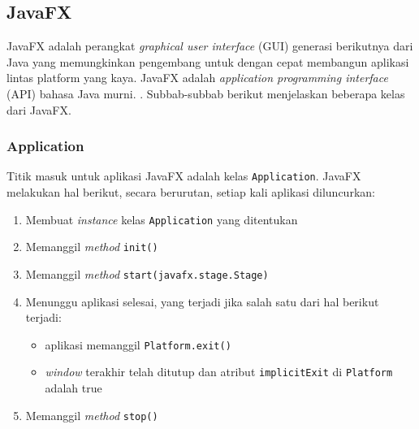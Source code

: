 \subsection{JavaFX}
\label{sec:javafx}
JavaFX adalah perangkat \textit{graphical user interface} (GUI) generasi berikutnya dari Java yang memungkinkan pengembang untuk dengan cepat membangun aplikasi lintas platform yang kaya. JavaFX adalah \textit{application programming interface} (API) bahasa Java murni. \cite{javafxintro}. Subbab-subbab berikut menjelaskan beberapa kelas dari JavaFX. \cite{javafx}


\subsubsection{Application}
Titik masuk untuk aplikasi JavaFX adalah kelas \texttt{Application}. JavaFX melakukan hal berikut, secara berurutan, setiap kali aplikasi diluncurkan:
\begin{enumerate}
    \item Membuat \textit{instance} kelas \texttt{Application} yang ditentukan
    \item Memanggil \textit{method} \texttt{init()}
    \item Memanggil \textit{method} \texttt{start(javafx.stage.Stage)}
    \item Menunggu aplikasi selesai, yang terjadi jika salah satu dari hal berikut terjadi:
    \begin{itemize}
        \item aplikasi memanggil \texttt{Platform.exit()}
        \item \textit{window} terakhir telah ditutup dan atribut \texttt{implicitExit} di \texttt{Platform} adalah true    
    \end{itemize}
    \item Memanggil \textit{method} \texttt{stop()}
\end{enumerate}

